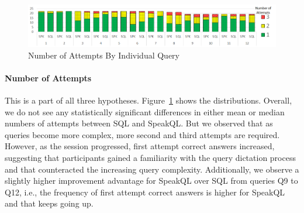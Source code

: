 \begin{figure}[t]
  \centering
  \includegraphics[width=\linewidth]{figures/query-attemptnum-histplot-excel.png}
  \caption{Number of Attempts By Individual Query}
  \label{fig:queryattemptnum}
\end{figure}

\paragraph{\textbf{Number of Attempts}}
This is a part of all three hypotheses. 
Figure~\ref{fig:queryattemptnum} shows the distributions. 
Overall, we do not see any statistically significant differences in either mean or median numbers of attempts between SQL and SpeakQL. 
But we observed that as queries become more complex, more second and third attempts are required. 
However, as the session progressed, first attempt correct answers increased, suggesting that participants gained a familiarity with the query dictation process and that counteracted the increasing query complexity. 
Additionally, we observe a slightly higher improvement advantage for SpeakQL over SQL from queries Q9 to Q12, i.e., the frequency of first attempt correct answers is higher for SpeakQL and that keeps going up.




